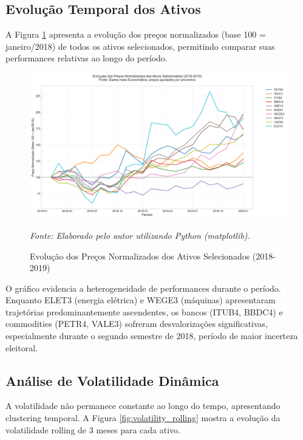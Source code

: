 \subsection{Evolução Temporal dos Ativos}

A Figura \ref{fig:price_evolution} apresenta a evolução dos preços normalizados (base 100 = janeiro/2018) de todos os ativos selecionados, permitindo comparar suas performances relativas ao longo do período.

\begin{figure}[H]
\centering
\includegraphics[width=\textwidth]{images/price_evolution.png}
\caption{Evolução dos Preços Normalizados dos Ativos Selecionados (2018-2019)}
\textit{Fonte: Elaborado pelo autor utilizando Python (matplotlib).}
\label{fig:price_evolution}
\end{figure}

O gráfico evidencia a heterogeneidade de performances durante o período. Enquanto ELET3 (energia elétrica) e WEGE3 (máquinas) apresentaram trajetórias predominantemente ascendentes, os bancos (ITUB4, BBDC4) e commodities (PETR4, VALE3) sofreram desvalorizações significativas, especialmente durante o segundo semestre de 2018, período de maior incerteza eleitoral.

\subsection{Análise de Volatilidade Dinâmica}

A volatilidade não permanece constante ao longo do tempo, apresentando clustering temporal. A Figura \ref{fig:volatility_rolling} mostra a evolução da volatilidade rolling de 3 meses para cada ativo.

